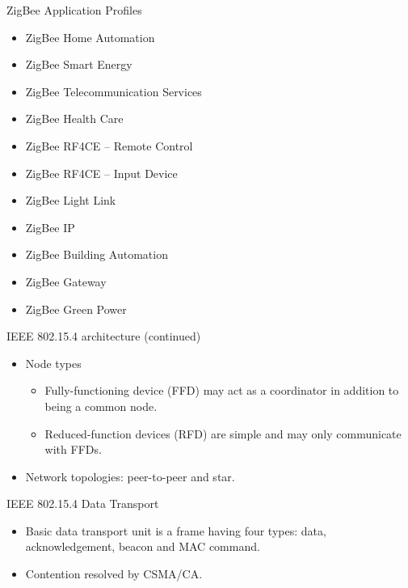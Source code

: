 \documentclass{beamer}
\begin{document}
\begin{frame}{ZigBee Application Profiles}
  \begin{itemize}
  	\item ZigBee Home Automation
    \item ZigBee Smart Energy
    \item ZigBee Telecommunication Services
    \item ZigBee Health Care
    \item ZigBee RF4CE – Remote Control
    \item ZigBee RF4CE – Input Device
    \item ZigBee Light Link
    \item ZigBee IP
    \item ZigBee Building Automation
    \item ZigBee Gateway
    \item ZigBee Green Power
  \end{itemize}
\end{frame}

\begin{frame}{IEEE 802.15.4 architecture (continued)}
  \begin{itemize}
    \item Node types  
      \begin{itemize}
      \item Fully-functioning device (FFD) may act as a coordinator in addition
      to being a common node. 
      \item Reduced-function devices (RFD) are simple and may only communicate
      with FFDs.
    \end{itemize}
    \item Network topologies: peer-to-peer and star.
  \end{itemize}
\end{frame}

\begin{frame}{IEEE 802.15.4 Data Transport}
  \begin{itemize}
    \item Basic data transport unit is a frame having four types: data, 
    acknowledgement, beacon and MAC command.
    \item Contention resolved by CSMA/CA.
  \end{itemize}
\end{frame}
\end{document}
